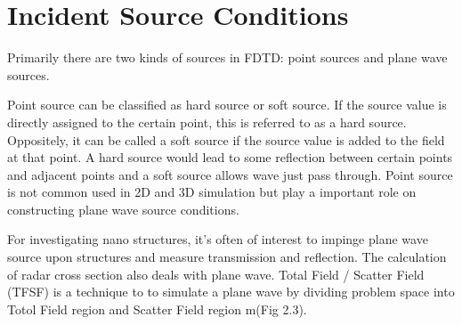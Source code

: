 \section{Incident Source Conditions}
Primarily there are two kinds of sources in FDTD: point sources and plane wave sources.

Point source can be classified as hard source or soft source. If the source value is directly assigned to the certain
point, this is referred to as a hard source. Oppositely, it can be called a soft source if the source value is added to
the field at that point. A hard source would lead to some reflection between certain points and adjacent points and a
soft source allows wave just pass through. Point source is not common used in 2D and 3D simulation but play a important
role on constructing plane wave source conditions.

For investigating nano structures, it's often of interest to impinge plane wave source upon structures and measure
transmission and reflection. The calculation of radar cross section also deals with plane wave. Total Field / Scatter
Field (TFSF) is a technique to to simulate a plane wave by dividing problem space into Totol Field region and Scatter
Field region m(Fig 2.3).

